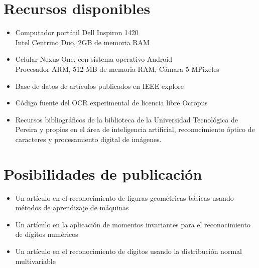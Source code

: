 \documentclass[a4paper, 11pt, oneside]{article}
\begin{document}
	\section{Recursos disponibles}
	\begin{itemize}
		\item Computador portátil Dell Inspiron 1420\\
			Intel Centrino Duo, 2GB de memoria RAM
		\item Celular Nexus One, con sistema operativo Android\\
			Procesador ARM, 512 MB de memoria RAM, Cámara 5 MPixeles
		\item Base de datos de artículos publicados en IEEE explore
		\item Código fuente del OCR experimental de licencia libre Ocropus
	    \item Recursos bibliográficos de la biblioteca de la Universidad Tecnológica de Pereira y propios en el área de inteligencia artificial, reconocimiento óptico de caracteres y procesamiento digital de imágenes.
	\end{itemize}
	
	\section{Posibilidades de publicación}
	\begin{itemize}
		\item Un artículo en el reconocimiento de figuras geométricas básicas usando métodos de aprendizaje de máquinas
		\item Un artículo en la aplicación de momentos invariantes para el reconocimiento de dígitos numéricos
		\item Un artículo en el reconocimiento de dígitos usando la distribución normal multivariable
	\end{itemize}
	
	\clearpage
	
\end{document}
